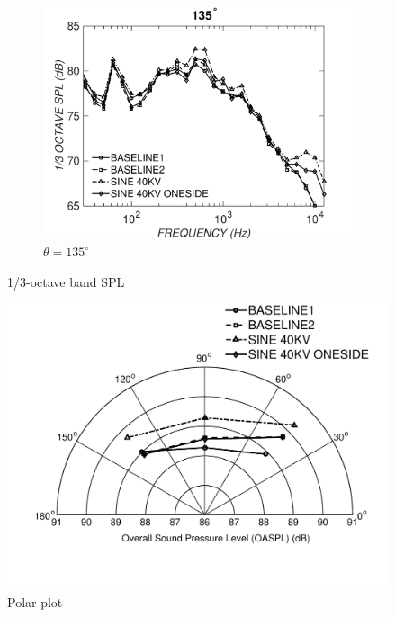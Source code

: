 \begin{figure}
\begin{center}
\hspace*{\fill} %

\begin{subfigure}{0.5\textwidth}
\includegraphics[width=\linewidth]{figures/octave135}
\caption{$\theta=135^\circ$}
\label{fig:octave135}
\end{subfigure}

\caption{1/3-octave band SPL}
\label{fig:octave}
\end{center}
\end{figure}

\begin{figure}
	\begin{center}
		\centerline{\includegraphics[scale=0.7]{figures/polar_plot4}}
		\caption{Polar plot}
		\label{fig:polar}
	\end{center}
\end{figure}

